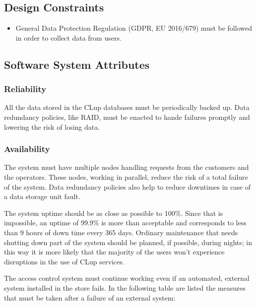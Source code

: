\subsection{Design Constraints}

\begin{itemize}
    \item General Data Protection Regulation (GDPR, EU 2016/679) must be followed in order to collect data from users.
\end{itemize}

\subsection{Software System Attributes}
\subsubsection{Reliability}
All the data stored in the CLup databases must be periodically backed up. Data redundancy policies, like RAID, must be enacted to hande failures promptly and lowering the risk of losing data.

\subsubsection{Availability}
The system must have multiple nodes handling requests from the customers and the operators. These nodes, working in parallel, reduce the risk of a total failure of the system. Data redundancy policies also help to reduce downtimes in case of a data storage unit fault.

\smallskip

The system uptime should be as close as possible to 100\%. Since that is impossible, an uptime of 99.9\% is more than acceptable and corresponds to less than 9 hours of down time every 365 days.
Ordinary maintenance that needs shutting down part of the system should be planned, if possible, during nights; in this way it is more likely that the majority of the users won't experience disruptions in the use of CLup services.

\smallskip

The access control system must continue working even if an automated, external system installed in the store fails. In the following table are listed the measures that must be taken after a failure of an external system:
\smallskip

\vfill
\pagebreak

